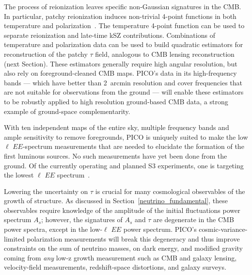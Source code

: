 \documentclass[PICOReport.tex]{subfiles}
\begin{document}
The process of reionization leaves specific non-Gaussian signatures in the CMB.  In particular, patchy reionization induces non-trivial 4-point functions in both temperature and polarization~\citep{SmithFerraro2017,DvorkinSmith2009}.  The temperature 4-point function can be used to separate reionization and late-time kSZ contributions.  Combinations of temperature and polarization data can be used to build quadratic estimators for reconstruction of the patchy $\tau$ field, analogous to CMB lensing reconstruction (next Section).  These estimators generally require high angular resolution, but also rely on foreground-cleaned CMB maps.  PICO's data in its high-frequency bands --- which have better than 2~arcmin resolution and cover frequencies that are not suitable for observations from the ground --- will enable these estimators to be robustly applied to high resolution ground-based CMB data, a strong example of ground-space complementarity.  %
%

With ten independent maps of the entire sky, multiple frequency bands and ample sensitivity to remove foregrounds, PICO is uniquely suited to make the low $\ell$ $EE$-spectrum measurements that are needed to elucidate the formation of the first luminous sources. No such measurements have yet been done from the ground. Of the currently operating and planned S3 experiments, one is targeting the lowest $\ell$ $EE$ spectrum~\citep{class_overview}. 

Lowering the uncertainty on $\tau$ is crucial for many cosmological observables of the growth of structure. As discussed in Section~\ref{neutrino_fundamental}, these observables require knowledge of the amplitude of the initial fluctuations power spectrum $A_s$; however, the signatures of $A_{s}$ and $\tau$ are degenerate in the %
CMB power spectra, except in the low-$\ell$ $EE$ power spectrum.  PICO's cosmic-variance-limited polarization measurements will break this degeneracy and thus improve constraints on the sum of neutrino masses, on dark energy, and modified gravity coming from {\it any} low-z growth measurement such as CMB and galaxy lensing, velocity-field measurements, redshift-space distortions, and galaxy surveys. 
\end{document}
